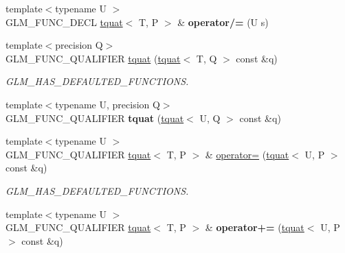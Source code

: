 \begin{DoxyCompactItemize}
\item 
\hypertarget{structglm_1_1tquat_ab9348510c32247974addf29b37304b2b}{{\footnotesize template$<$typename U $>$ }\\G\-L\-M\-\_\-\-F\-U\-N\-C\-\_\-\-D\-E\-C\-L \hyperlink{structglm_1_1tquat}{tquat}$<$ T, P $>$ \& {\bfseries operator/=} (U s)}\label{structglm_1_1tquat_ab9348510c32247974addf29b37304b2b}

\item 
\hypertarget{structglm_1_1tquat_a1462c0039d696557ba42636623b80c63}{{\footnotesize template$<$precision Q$>$ }\\G\-L\-M\-\_\-\-F\-U\-N\-C\-\_\-\-Q\-U\-A\-L\-I\-F\-I\-E\-R \hyperlink{structglm_1_1tquat_a1462c0039d696557ba42636623b80c63}{tquat} (\hyperlink{structglm_1_1tquat}{tquat}$<$ T, Q $>$ const \&q)}\label{structglm_1_1tquat_a1462c0039d696557ba42636623b80c63}

\begin{DoxyCompactList}\small\item\em G\-L\-M\-\_\-\-H\-A\-S\-\_\-\-D\-E\-F\-A\-U\-L\-T\-E\-D\-\_\-\-F\-U\-N\-C\-T\-I\-O\-N\-S. \end{DoxyCompactList}\item 
\hypertarget{structglm_1_1tquat_a57b7361c175efbbeb05d551473cc63d8}{{\footnotesize template$<$typename U, precision Q$>$ }\\G\-L\-M\-\_\-\-F\-U\-N\-C\-\_\-\-Q\-U\-A\-L\-I\-F\-I\-E\-R {\bfseries tquat} (\hyperlink{structglm_1_1tquat}{tquat}$<$ U, Q $>$ const \&q)}\label{structglm_1_1tquat_a57b7361c175efbbeb05d551473cc63d8}

\item 
\hypertarget{structglm_1_1tquat_a280d36cd56dabfc93402adb201e87e63}{{\footnotesize template$<$typename U $>$ }\\G\-L\-M\-\_\-\-F\-U\-N\-C\-\_\-\-Q\-U\-A\-L\-I\-F\-I\-E\-R \hyperlink{structglm_1_1tquat}{tquat}$<$ T, P $>$ \& \hyperlink{structglm_1_1tquat_a280d36cd56dabfc93402adb201e87e63}{operator=} (\hyperlink{structglm_1_1tquat}{tquat}$<$ U, P $>$ const \&q)}\label{structglm_1_1tquat_a280d36cd56dabfc93402adb201e87e63}

\begin{DoxyCompactList}\small\item\em G\-L\-M\-\_\-\-H\-A\-S\-\_\-\-D\-E\-F\-A\-U\-L\-T\-E\-D\-\_\-\-F\-U\-N\-C\-T\-I\-O\-N\-S. \end{DoxyCompactList}\item 
\hypertarget{structglm_1_1tquat_a90b089779296e6f39f7aa9cddaf3ce83}{{\footnotesize template$<$typename U $>$ }\\G\-L\-M\-\_\-\-F\-U\-N\-C\-\_\-\-Q\-U\-A\-L\-I\-F\-I\-E\-R \hyperlink{structglm_1_1tquat}{tquat}$<$ T, P $>$ \& {\bfseries operator+=} (\hyperlink{structglm_1_1tquat}{tquat}$<$ U, P $>$ const \&q)}\label{structglm_1_1tquat_a90b089779296e6f39f7aa9cddaf3ce83}


\end{DoxyCompactItemize}
